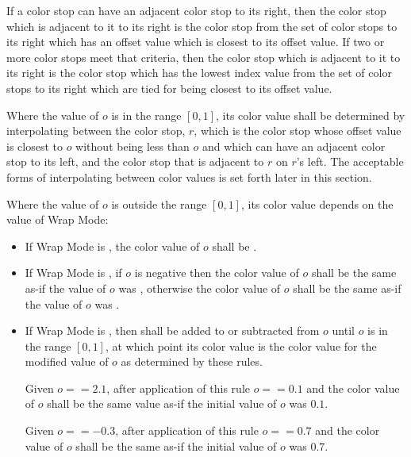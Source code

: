 \begin{enumeratea}
\item If a color stop can have an adjacent color stop to its right, then the color stop which is adjacent to it to its right is the color stop from the set of color stops to its right which has an offset value which is closest to its offset value. If two or more color stops meet that criteria, then the color stop which is adjacent to it to its right is the color stop which has the lowest index value from the set of color stops to its right which are tied for being closest to its offset value.

\item Where the value of $o$ is in the range $[0,1]$, its color value shall be determined by interpolating between the color stop, $r$, which is the color stop whose offset value is closest to $o$ without being less than $o$ and which can have an adjacent color stop to its left, and the color stop that is adjacent to $r$ on $r$'s left. The acceptable forms of interpolating between color values is set forth later in this section.

\item Where the value of $o$ is outside the range $[0,1]$, its color value depends on the value of Wrap Mode:
	\begin{itemize}
	\item If Wrap Mode is , the color value of $o$ shall be .
	
	\item If Wrap Mode is , if $o$ is negative then the color value of $o$ shall be the same as-if the value of $o$ was , otherwise the color value of $o$ shall be the same as-if the value of $o$ was .
	
	\item If Wrap Mode is , then  shall be added to or subtracted from $o$ until $o$ is in the range $[0,1]$, at which point its color value is the color value for the modified value of $o$ as determined by these rules.
	\begin{example}
	Given $o == 2.1$, after application of this rule $o == 0.1$ and the color value of $o$ shall be the same value as-if the initial value of $o$ was $0.1$.
	
	Given $o == -0.3$, after application of this rule $o == 0.7$ and the color value of $o$ shall be the same as-if the initial value of $o$ was $0.7$.
	\end{example}
	

\end{itemize}
\end{enumeratea}
